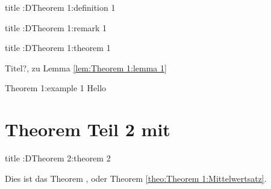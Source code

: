 \begin{definition}{title :D}{Theorem 1:definition 1}%
	\lipsum[1-1]
\end{definition}%
\begin{remark}{title :D}{Theorem 1:remark 1}%
	\lipsum[1-1]
\end{remark}%

\begin{theorem}{title :D}{Theorem 1:theorem 1}%
	\lipsum[1-1]
\end{theorem}%
\begin{proof*}{Titel?, zu Lemma \ref{lem:Theorem 1:lemma 1}}%
	\lipsum[1-1]
\end{proof*}
\begin{example}{}{Theorem 1:example 1}
Hello
\end{example}

\chapter{Theorem Teil 2 mit \texorpdfstring{}{tcolorbox}}%
\label{chap:Theorem 2}%
\begin{theorem}{title :D}{Theorem 2:theorem 2}%
	\lipsum[1-1]
\end{theorem}%
Dies ist das Theorem , oder Theorem \ref{theo:Theorem 1:Mittelwertsatz}. \lipsum[1-1]%
\newpage%
\layout%
\newpage%


\newpage%
\AfterCalculatingTypearea{%
	\TUMAfterCalculatingTypearea%
}\recalctypearea%
